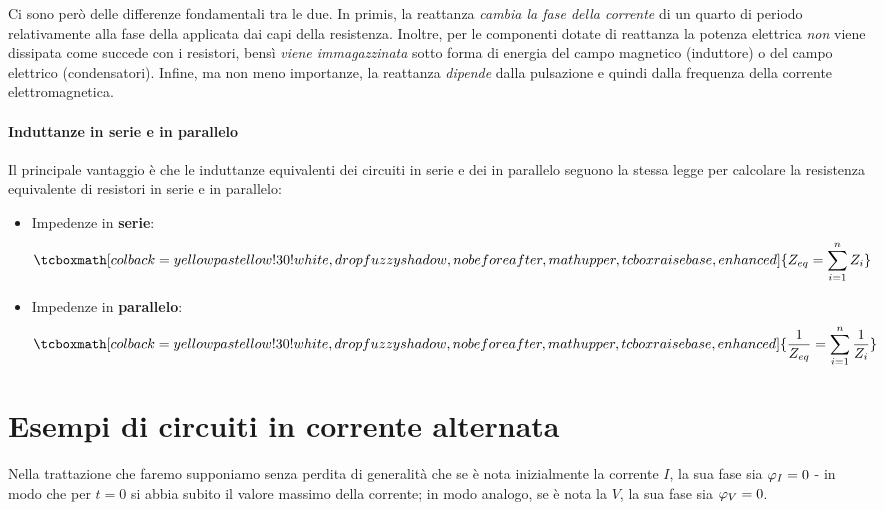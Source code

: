 Ci sono però delle differenze fondamentali tra le due. In primis, la reattanza \textit{cambia la fase della corrente}  di un quarto di periodo relativamente alla fase della \ddp applicata dai capi della resistenza.
Inoltre, per le componenti dotate di reattanza la potenza elettrica \textit{non} viene dissipata come succede con i resistori, bensì \textit{viene immagazzinata} sotto forma di energia del campo magnetico (induttore) o del campo elettrico (condensatori).
Infine, ma non meno importanze, la reattanza \textit{dipende} dalla pulsazione e quindi dalla frequenza della corrente elettromagnetica.
\paragraph{Induttanze in serie e in parallelo}
Il principale vantaggio è che le induttanze equivalenti dei circuiti in serie e dei in parallelo seguono la stessa legge per calcolare la resistenza equivalente di resistori in serie e in parallelo:
\begin{itemize}
	\item Impedenze in \textbf{serie}:
	\begin{equation}
		\tcboxmath[colback=yellowpastellow!30!white,drop fuzzy shadow, nobeforeafter, math upper, tcbox raise base, enhanced]{Z_{eq}=\sum_{i=1}^{n}Z_i}
	\end{equation}
	\item Impedenze in \textbf{parallelo}:
	\begin{equation}
		\tcboxmath[colback=yellowpastellow!30!white,drop fuzzy shadow, nobeforeafter, math upper, tcbox raise base, enhanced]{\frac{1}{Z_{eq}}=\sum_{i=1}^{n}\frac{1}{Z_i}}
	\end{equation}
\end{itemize}
\section{Esempi di circuiti in corrente alternata}
Nella trattazione che faremo supponiamo senza perdita di generalità che se è nota inizialmente la corrente $I$, la sua fase sia $\oldphi_I=0$ - in modo che per $t=0$ si abbia subito il valore massimo della corrente; in modo analogo, se è nota la \ddp $V$, la sua fase sia $\oldphi_V=0$.
